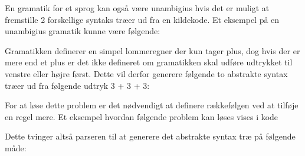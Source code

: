 
En gramatik for et sprog kan også være unambigius hvis det er muligt at fremstille 2 forskellige syntaks træer ud fra en kildekode. Et eksempel på en unambigius gramatik kunne være følgende:


Gramatikken definerer en simpel lommeregner der kun tager plus, dog hvis der er mere end et plus er det ikke defineret om gramatikken skal udføre udtrykket til venstre eller højre først. Dette vil derfor generere følgende to abstrakte syntax træer ud fra følgende udtryk 3 + 3 + 3:

For at løse dette problem er det nødvendigt at definere rækkefølgen ved at tilføje en regel mere. Et eksempel hvordan følgende problem kan løses vises i kode 


Dette tvinger altså parseren til at generere det abstrakte syntax træ på følgende måde:








